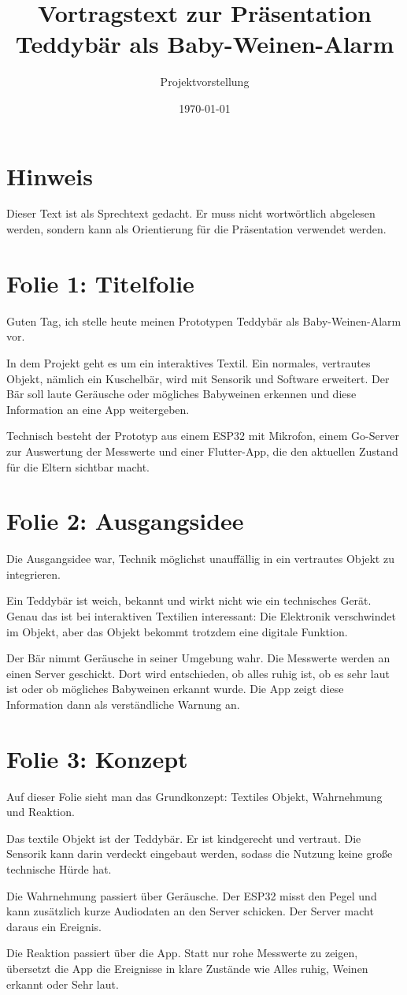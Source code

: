 \documentclass[11pt,a4paper]{article}
\title{Vortragstext zur Präsentation\\
\large Teddybär als Baby-Weinen-Alarm}
\author{Projektvorstellung}
\date{\today}
\newcommand{\folie}[2]{%
  \section*{Folie #1: #2}
}
\begin{document}
\maketitle

\section*{Hinweis}
Dieser Text ist als Sprechtext gedacht. Er muss nicht wortwörtlich
abgelesen werden, sondern kann als Orientierung für die Präsentation
verwendet werden.

\folie{1}{Titelfolie}
Guten Tag, ich stelle heute meinen Prototypen \glqq Teddybär als
Baby-Weinen-Alarm\grqq{} vor.

In dem Projekt geht es um ein interaktives Textil. Ein normales,
vertrautes Objekt, nämlich ein Kuschelbär, wird mit Sensorik und
Software erweitert. Der Bär soll laute Geräusche oder mögliches
Babyweinen erkennen und diese Information an eine App weitergeben.

Technisch besteht der Prototyp aus einem ESP32 mit Mikrofon, einem
Go-Server zur Auswertung der Messwerte und einer Flutter-App, die den
aktuellen Zustand für die Eltern sichtbar macht.

\folie{2}{Ausgangsidee}
Die Ausgangsidee war, Technik möglichst unauffällig in ein vertrautes
Objekt zu integrieren.

Ein Teddybär ist weich, bekannt und wirkt nicht wie ein technisches
Gerät. Genau das ist bei interaktiven Textilien interessant: Die
Elektronik verschwindet im Objekt, aber das Objekt bekommt trotzdem eine
digitale Funktion.

Der Bär nimmt Geräusche in seiner Umgebung wahr. Die Messwerte werden an
einen Server geschickt. Dort wird entschieden, ob alles ruhig ist, ob es
sehr laut ist oder ob mögliches Babyweinen erkannt wurde. Die App zeigt
diese Information dann als verständliche Warnung an.

\folie{3}{Konzept}
Auf dieser Folie sieht man das Grundkonzept: Textiles Objekt,
Wahrnehmung und Reaktion.

Das textile Objekt ist der Teddybär. Er ist kindgerecht und vertraut.
Die Sensorik kann darin verdeckt eingebaut werden, sodass die Nutzung
keine große technische Hürde hat.

Die Wahrnehmung passiert über Geräusche. Der ESP32 misst den Pegel und
kann zusätzlich kurze Audiodaten an den Server schicken. Der Server
macht daraus ein Ereignis.

Die Reaktion passiert über die App. Statt nur rohe Messwerte zu zeigen,
übersetzt die App die Ereignisse in klare Zustände wie \glqq Alles
ruhig\grqq{}, \glqq Weinen erkannt\grqq{} oder \glqq Sehr laut\grqq{}.
\end{document}
